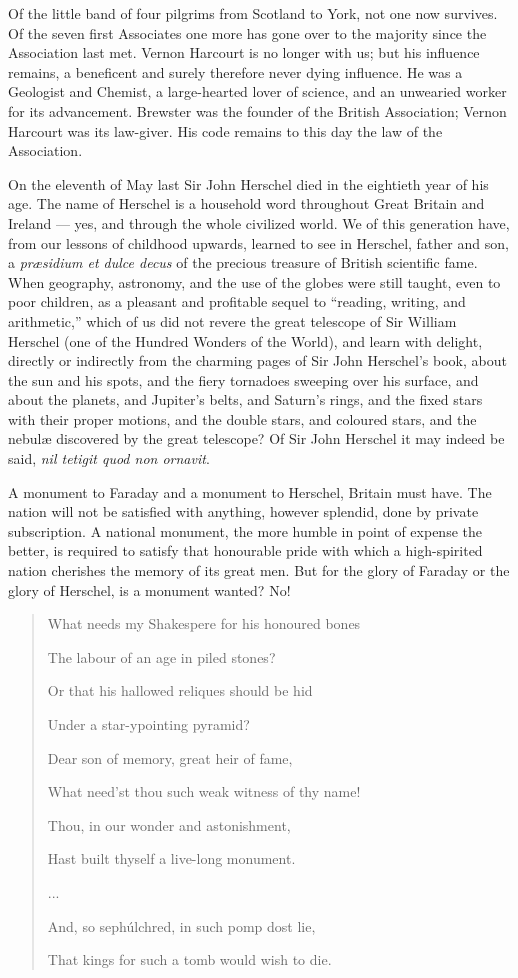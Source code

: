 \documentclass[a4paper, 11pt, oneside, english]{article}
\begin{document}
Of the little band of four pilgrims from Scotland to York, not one now survives. Of the seven first Associates one more has gone over to the majority since the Association last met. Vernon Harcourt is no longer with us; but his influence remains, a beneficent and surely therefore never dying influence. He was a Geologist and Chemist, a large-hearted lover of science, and an unwearied worker for its advancement. Brewster was the founder of the British Association; Vernon Harcourt was its law-giver. His code remains to this day the law of the Association.

On the eleventh of May last Sir John Herschel died in the eightieth year of his age. The name of Herschel is a household word throughout Great Britain and Ireland --- yes, and through the whole civilized world. We of this generation have, from our lessons of childhood upwards, learned to see in Herschel, father and son, a \emph{præsidium et dulce decus} of the precious treasure of British scientific fame. When geography, astronomy, and the use of the globes were still taught, even to poor children, as a pleasant and profitable sequel to ``reading, writing, and arithmetic,'' which of us did not revere the great telescope of Sir William Herschel (one of the Hundred Wonders of the World), and learn with delight, directly or indirectly from the charming pages of Sir John Herschel's book, about the sun and his spots, and the fiery tornadoes sweeping over his surface, and about the planets, and Jupiter's belts, and Saturn's rings, and the fixed stars with their proper motions, and the double stars, and coloured stars, and the nebulæ discovered by the great telescope? Of Sir John Herschel it may indeed be said, \emph{nil tetigit quod non ornavit}.

A monument to Faraday and a monument to Herschel, Britain must have. The nation will not be satisfied with anything, however splendid, done by private subscription. A national monument, the more humble in point of expense the better, is required to satisfy that honourable pride with which a high-spirited nation cherishes the memory of its great men. But for the glory of Faraday or the glory of Herschel, is a monument wanted? No!
\begin{quotation}
\small
What needs my Shakespere for his honoured bones

The labour of an age in piled stones?

Or that his hallowed reliques should be hid

Under a star-ypointing pyramid?

Dear son of memory, great heir of fame,

What need'st thou such weak witness of thy name!

Thou, in our wonder and astonishment,

Hast built thyself a live-long monument.

...

And, so sephúlchred, in such pomp dost lie,

That kings for such a tomb would wish to die.
\end{quotation}
\end{document}
